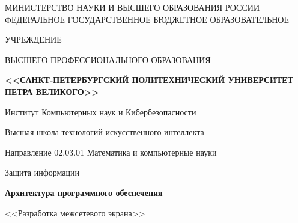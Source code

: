 \documentclass[12pt,a4paper,final]{article}
\begin{document}
	\noindent
	\begin{center}
		\thispagestyle{empty}
		\large{МИНИСТЕРСТВО НАУКИ И ВЫСШЕГО ОБРАЗОВАНИЯ РОССИИ\\
			\vspace{3mm}
			ФЕДЕРАЛЬНОЕ ГОСУДАРСТВЕННОЕ БЮДЖЕТНОЕ ОБРАЗОВАТЕЛЬНОЕ}\end{center}\vspace{-5mm}
	\begin{center}\large{УЧРЕЖДЕНИЕ}\end{center}
	\begin{center}\vspace{-3mm}\large{ВЫСШЕГО ПРОФЕССИОНАЛЬНОГО ОБРАЗОВАНИЯ}\end{center}
	\begin{center}\large\textbf{<<САНКТ-ПЕТЕРБУРГСКИЙ ПОЛИТЕХНИЧЕСКИЙ УНИВЕРСИТЕТ
			ПЕТРА ВЕЛИКОГО>>}\end{center}
	\begin{center}
		\normalsize{Институт Компьютерных наук и Кибербезопасности}
	\end{center}
	\begin{center}
		Высшая школа технологий искусственного интеллекта
	\end{center}
	\begin{center}
		Направление 02.03.01 Математика и компьютерные науки
	\end{center}

	\vspace{0.3cm}

	\begin{center}
		\large Защита информации
	\end{center}
	\begin{center}
		\Large\textbf{Архитектура программного обеспечения}
	\end{center}
	\begin{center}
		\large<<Разработка межсетевого экрана>>
	\end{center}
\end{document}
